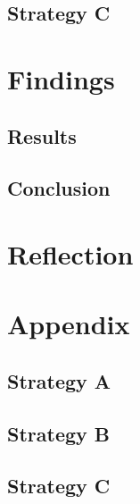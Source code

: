 \documentclass[12pt]{article}
\begin{document}
\subsection{Strategy C}
\section{Findings}
\subsection{Results}
\subsection{Conclusion}
\section{Reflection}
\section{Appendix}
\subsection{Strategy A}
\subsection{Strategy B}
\subsection{Strategy C}
\end{document}
